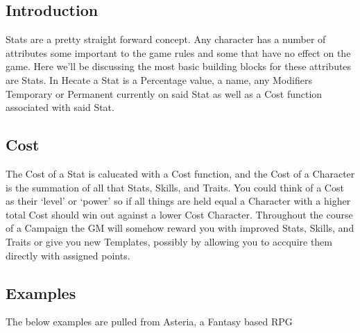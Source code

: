 
\subsection{Introduction}
\Glspl{Stat} are a pretty straight forward concept.  Any character
has a number of attributes some important to the game rules and
some that have no effect on the game.  Here we'll be discussing
the most basic building blocks for these attributes are Stats.
In Hecate a \gls{Stat} is a Percentage value, a name, any
\glspl{Modifier} Temporary or Permanent currently on said \gls{Stat}
as well as a \gls{Cost} function associated with said \gls{Stat}.

\subsection{Cost}
The \gls{Cost} of a \gls{Stat} is calucated with a \gls{Cost}
function, and the \gls{Cost} of a \gls{Character} is the summation
of all that  \glspl{Stat},
\glspl{Skill}, and \glspl{Trait}.  You could think of a
 \gls{Cost} as their `level' or `power'
so if all things are held equal a \gls{Character} with a higher
total \gls{Cost} should win out against a lower \gls{Cost}
\gls{Character}.  Throughout the course of a \gls{Campaign} the
\gls{GM} will somehow reward you with improved \glspl{Stat}, \glspl{Skill},
and \glspl{Trait} or give you new \glspl{Template}, possibly by
allowing you to accquire them directly with assigned points.

\subsection{Examples}
The below examples are pulled from Asteria, a Fantasy based \gls{RPG}

